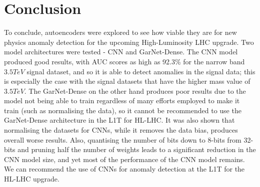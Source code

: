 \documentclass[a4paper]{article}
\theoremstyle{plain}
\theoremstyle{definition}
\begin{document}
    \section{Conclusion}
    \label{section:conclusion}

     To conclude, autoencoders were explored to see how viable they are for new physics anomaly detection for the upcoming High-Luminosity LHC upgrade. Two model architectures were tested - CNN and GarNet-Dense. The CNN model produced good results, with AUC scores as high as 92.3\% for the narrow band $3.5 TeV$ signal dataset, and so it is able to detect anomalies in the signal data; this is especially the case with the signal datasets that have the higher mass value of $3.5 TeV$. The GarNet-Dense on the other hand produces poor results due to the model not being able to train regardless of many efforts employed to make it train (such as normalising the data), so it cannot be recommended to use the GarNet-Dense architecture in the L1T for HL-LHC. It was also shown that normalising the datasets for CNNs, while it removes the data bias, produces overall worse results. Also, quantising the number of bits down to 8-bits from 32-bits and pruning half the number of weights leads to a significant reduction in the CNN model size, and yet most of the performance of the CNN model remains. We can recommend the use of CNNs for anomaly detection at the L1T for the HL-LHC upgrade.
    
    \newpage
    
    
    \appendix
    
\end{document}
